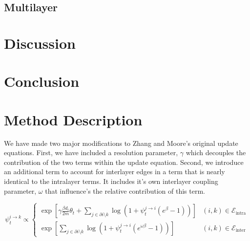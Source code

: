 \documentclass[11pt]{article}
\begin{document}
\FloatBarrier
\subsection{Multilayer}




\section{Discussion}
\section{Conclusion}

\section{Method Description \label{methods}}

We have made two major modifications to Zhang and Moore's original  update equations.  First, we have included a resolution parameter, $\gamma$ which decouples the contribution of the two terms within the update equation.  Second, we introduce an additional term to account for interlayer edges in a term that is nearly identical to the intralayer terms.  It includes it's own interlayer coupling parameter, $\omega$ that influence's the relative contribution of this term.  


\begin{equation}
\psi^{i \to k }_t \propto \begin{cases}  \exp {\left [ \gamma \frac{\beta d_i }{2m}\theta_t  + \sum_{j\in \partial i \setminus k} \log{(1+\psi^{j \to i }_t(e^{\beta}-1))} \right]} & (i,k) \in \mathcal{E}_{\text{intra}}\\ 
\exp {\left [  \sum_{j\in \partial i \setminus k} \log{(1+\psi^{j \to i }_t(e^{\omega\beta}-1))}\right ]} & (i,k)\in \mathcal{E}_{\text{inter}} \end{cases}
\end{equation}
\end{document}
